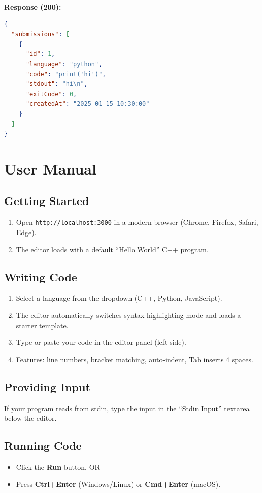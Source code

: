 \documentclass[12pt,a4paper]{report}
\begin{document}
\textbf{Response (200):}
\begin{lstlisting}[language=json]
{
  "submissions": [
    {
      "id": 1,
      "language": "python",
      "code": "print('hi')",
      "stdout": "hi\n",
      "exitCode": 0,
      "createdAt": "2025-01-15 10:30:00"
    }
  ]
}
\end{lstlisting}

\chapter{User Manual}

\section{Getting Started}
\begin{enumerate}
    \item Open \texttt{http://localhost:3000} in a modern browser (Chrome, Firefox, Safari, Edge).
    \item The editor loads with a default ``Hello World'' C++ program.
\end{enumerate}

\section{Writing Code}
\begin{enumerate}
    \item Select a language from the dropdown (C++, Python, JavaScript).
    \item The editor automatically switches syntax highlighting mode and loads a starter template.
    \item Type or paste your code in the editor panel (left side).
    \item Features: line numbers, bracket matching, auto-indent, Tab inserts 4 spaces.
\end{enumerate}

\section{Providing Input}
If your program reads from stdin, type the input in the ``Stdin Input'' textarea below the editor.

\section{Running Code}
\begin{itemize}
    \item Click the \textbf{Run} button, OR
    \item Press \textbf{Ctrl+Enter} (Windows/Linux) or \textbf{Cmd+Enter} (macOS).
\end{itemize}
\end{document}
